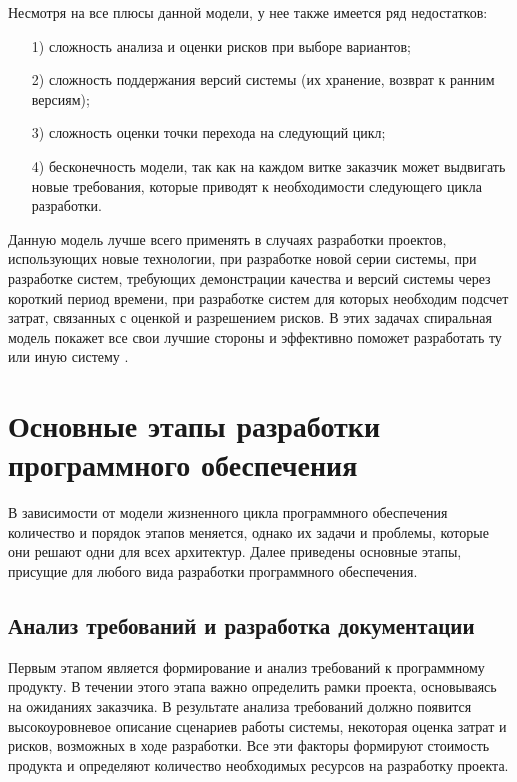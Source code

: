 Несмотря на все плюсы данной модели, у нее также имеется ряд недостатков: 

\begin{enumerate}
    \item [1)] сложность анализа и оценки  рисков при выборе вариантов;
    \item [2)] сложность поддержания версий системы (их хранение, возврат к ранним версиям);
    \item [3)] сложность оценки точки перехода на следующий цикл;
    \item [4)] бесконечность модели, так как на каждом витке заказчик может выдвигать новые требования, которые приводят к необходимости следующего цикла разработки.
\end{enumerate}

Данную модель лучше всего применять в случаях разработки проектов, использующих новые технологии, при разработке новой серии системы, при разработке систем, требующих демонстрации качества и версий системы через короткий период времени, при разработке систем для которых необходим подсчет затрат, связанных с оценкой и разрешением рисков. В этих задачах спиральная модель покажет все свои лучшие стороны и эффективно поможет разработать ту или иную систему \cite{26}. 

\section{Основные этапы разработки программного обеспечения}
В зависимости от модели жизненного цикла программного обеспечения количество и порядок этапов меняется, однако их задачи и проблемы, которые они решают одни для всех архитектур. Далее приведены основные этапы, присущие для любого вида разработки программного обеспечения.
\subsection{Анализ требований и разработка документации}
Первым этапом является формирование и анализ требований к программному продукту. В течении этого этапа важно определить рамки проекта, основываясь на ожиданиях заказчика. В результате анализа требований должно появится высокоуровневое описание сценариев работы системы, некоторая оценка затрат и рисков, возможных в ходе разработки. Все эти факторы формируют стоимость продукта и определяют количество необходимых ресурсов на разработку проекта. 

